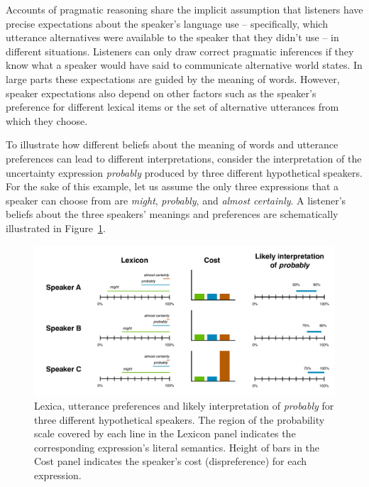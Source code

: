 Accounts of pragmatic reasoning share the implicit assumption that listeners have precise expectations
 about the speaker's language use -- specifically, which utterance alternatives were available to the 
 speaker that they didn't use -- in different situations. Listeners can only draw correct pragmatic 
 inferences if they know what a speaker would have said to communicate alternative world states. 
 In large parts these expectations are guided by the meaning of words.
However, speaker expectations also depend on other factors such as the speaker's preference for
 different lexical items or the set of alternative utterances from which they choose.
 
To illustrate how different beliefs about the meaning of words and utterance preferences can lead to different interpretations, consider the interpretation 
of the uncertainty expression \textit{probably} produced by three different hypothetical speakers. For the sake of this example, 
let us assume the only three expressions that a speaker can choose from are \textit{might}, \textit{probably}, and \textit{almost certainly}.
A listener's beliefs about the three speakers' meanings and preferences are schematically illustrated in Figure~\ref{fig:inference-example}.

\begin{figure}
\center
\includegraphics[width=\textwidth]{plots/fig-1-implicatures.pdf}
\caption{Lexica, utterance preferences and likely interpretation of \textit{probably} for three different hypothetical speakers. The region of the probability scale covered by each line in the Lexicon panel indicates the corresponding expression's literal semantics. Height of bars in the Cost panel indicates the speaker's cost (dispreference) for each expression.}
\label{fig:inference-example}
\end{figure}

